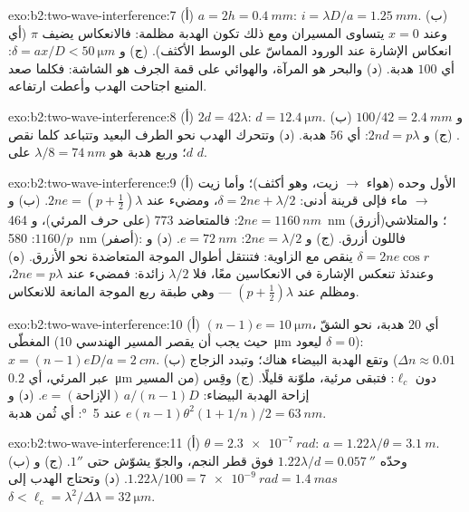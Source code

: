 \begin{solution}{exo:b2:two-wave-interference:7}
(أ) $a = 2h = \qty{0.4}{mm}$: $i = \lambda D/a = \qty{1.25}{mm}$. (ب) وعند $x = 0$ يتساوى المسيران
ومع ذلك تكون الهدبة مظلمة: فالانعكاس يضيف $\pi$ (أي انعكاس
الإشارة عند الورود المماسّ على الوسط الأكثف). (ج) و $\delta = ax/D <
\qty{50}{\micro m}$: أي $100$ هدبة. (د) والبحر هو المرآة، والهوائي على قمة
الجرف هو الشاشة: فكلما صعد المنبع اجتاحت الهدب وأعطت
ارتفاعه.
\end{solution}

\begin{solution}{exo:b2:two-wave-interference:8}
(أ) $2d = 42\lambda$: $d = \qty{12.4}{\micro m}$. (ب) و $100/42 = \qty{2.4}{mm}$. (ج) و $2nd = p\lambda$:
أي $56$ هدبة. (د) وتتحرك الهدب نحو الطرف البعيد وتتباعد كلما نقص $d$؛
وربع هدبة هو $\lambda/8 = \qty{74}{nm}$ على $d$.
\end{solution}

\begin{solution}{exo:b2:two-wave-interference:9}
(أ) الأول وحده (هواء $\to$ زيت، وهو أكثف)؛ وأما زيت $\to$ ماء فإلى قرينة
أدنى: $\delta = 2ne + \lambda/2$، ومضيء عند $2ne = (p + \tfrac12)\lambda$. (ب) و $2ne =
\qty{1160}{nm}$: فالمتعاضد $773$ (على حرف المرئي)، و \qty{464}{nm} (أزرق)؛
والمتلاشي $1160/p$: \qty{580}{nm} (أصفر): فاللون أزرق. (ج) و $2ne = \lambda/2$: $e = \qty{72}{nm}$.
(د) و $\delta = 2ne\cos r$ ينقص مع الزاوية: فتنتقل أطوال الموجة المتعاضدة
نحو الأزرق. (ه) وعندئذ تنعكس الإشارة في الانعكاسين معًا، فلا
$\lambda/2$ زائدة: فمضيء عند $2ne = p\lambda$، ومظلم عند $(p + \tfrac12)\lambda$ --- وهي
طبقة ربع الموجة المانعة للانعكاس.
\end{solution}

\begin{solution}{exo:b2:two-wave-interference:10}
(أ) $(n - 1)e = \qty{10}{\micro m}$، أي $20$ هدبة، نحو الشقّ المغطّى (حيث
يجب أن يقصر المسير الهندسي \qty{10}{\micro m} ليعود $\delta = 0$):
$x = (n - 1)eD/a = \qty{2}{cm}$. (ب) وتقع الهدبة البيضاء هناك؛ وتبدد
الزجاج ($\Delta n \approx 0.01$ عبر المرئي، أي \qty{0.2}{\micro m} من المسير)
دون $\ell_c$: فتبقى مرئية، ملوّنة قليلًا. (ج) وقِس
إزاحة الهدبة البيضاء: $e = (\text{الإزاحة})\,a/(n - 1)D$. (د) و $e(n - 1)\theta^2
(1 + 1/n)/2 = \qty{63}{nm}$ عند \qty{5}{\degree}: أي ثُمن هدبة.
\end{solution}

\begin{solution}{exo:b2:two-wave-interference:11}
(أ) $\theta = \qty{2.3e-7}{rad}$: $a = 1.22\lambda/\theta = \qty{3.1}{m}$. (ب) وحدّه $1.22\lambda/d =
\qty{0.057}{''}$ فوق قطر النجم، والجوّ يشوّش
حتى $1''$. (ج) و $1.22\lambda/100 = \qty{7e-9}{rad} = \qty{1.4}{mas}$. (د) وتحتاج الهدب إلى
$\delta < \ell_c = \lambda^2/\Delta\lambda = \qty{32}{\micro m}$.
\end{solution}

